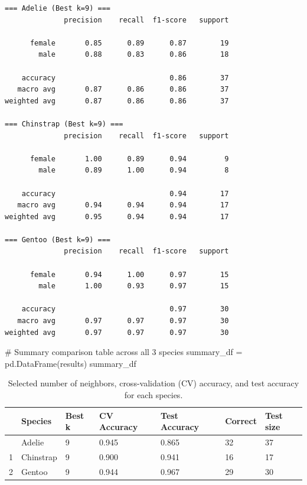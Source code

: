 \documentclass[
  letterpaper,
  DIV=11,
  numbers=noendperiod]{scrartcl}
\newenvironment{Shaded}{\begin{snugshade}}{\end{snugshade}}
\newcommand{\CommentTok}[1]{\textcolor[rgb]{0.37,0.37,0.37}{#1}}
\newcommand{\NormalTok}[1]{\textcolor[rgb]{0.00,0.23,0.31}{#1}}
\newcommand{\OperatorTok}[1]{\textcolor[rgb]{0.37,0.37,0.37}{#1}}
\begin{document}
\begin{verbatim}
=== Adelie (Best k=9) ===
              precision    recall  f1-score   support

      female       0.85      0.89      0.87        19
        male       0.88      0.83      0.86        18

    accuracy                           0.86        37
   macro avg       0.87      0.86      0.86        37
weighted avg       0.87      0.86      0.86        37

=== Chinstrap (Best k=9) ===
              precision    recall  f1-score   support

      female       1.00      0.89      0.94         9
        male       0.89      1.00      0.94         8

    accuracy                           0.94        17
   macro avg       0.94      0.94      0.94        17
weighted avg       0.95      0.94      0.94        17

=== Gentoo (Best k=9) ===
              precision    recall  f1-score   support

      female       0.94      1.00      0.97        15
        male       1.00      0.93      0.97        15

    accuracy                           0.97        30
   macro avg       0.97      0.97      0.97        30
weighted avg       0.97      0.97      0.97        30
\end{verbatim}

\begin{Shaded}
\begin{Highlighting}[]
\CommentTok{\# Summary comparison table across all 3 species}
\NormalTok{summary\_df }\OperatorTok{=}\NormalTok{ pd.DataFrame(results)}
\NormalTok{summary\_df}
\end{Highlighting}
\end{Shaded}

{

\begin{longtable}[]{@{}lllllll@{}}

\caption{\label{tbl-results}Selected number of neighbors,
cross-validation (CV) accuracy, and test accuracy for each species.}

\tabularnewline

\toprule\noalign{}
& Species & Best k & CV Accuracy & Test Accuracy & Correct & Test
size \\
\midrule\noalign{}
\endhead
\bottomrule\noalign{}
\endlastfoot
0 & Adelie & 9 & 0.945 & 0.865 & 32 & 37 \\
1 & Chinstrap & 9 & 0.900 & 0.941 & 16 & 17 \\
2 & Gentoo & 9 & 0.944 & 0.967 & 29 & 30 \\

\end{longtable}

}
\end{document}

